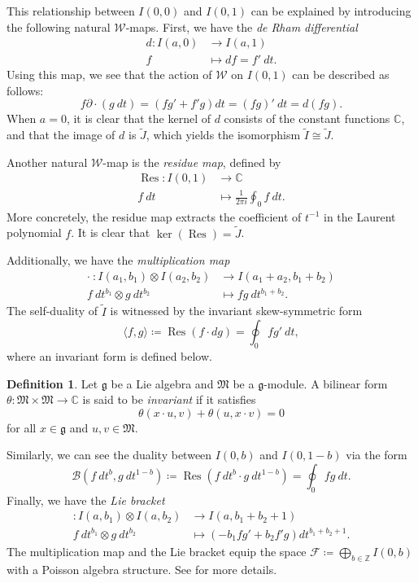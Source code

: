 \documentclass[11pt, svgnames]{amsart}
\DeclareMathOperator{\Res}{Res}
\newcommand{\g}{\ensuremath{\mathfrak{g}}}
\newcommand{\M}{\mathfrak{M}}
\newcommand{\ZZ}{\mathbb{Z}}
\newcommand{\CC}{\mathbb{C}}
\newcommand{\W}{\mathcal{W}}
\newcommand{\del}{\partial}
\newcommand{\ang}[1]{\langle #1 \rangle}
\theoremstyle{definition}
\newtheorem{defn}[proposition]{Definition}
\begin{document}
This relationship between $I(0,0)$ and $I(0,1)$ can be explained by introducing the following natural $\W$-maps. First, we have the \emph{de Rham differential}
\begin{align*}
    d \colon I(a,0) &\to I(a,1) \\
    f &\mapsto df = f' \ dt.
\end{align*}
Using this map, we see that the action of $\W$ on $I(0,1)$ can be described as follows:
$$f\del \cdot (g \ dt) = (fg' + f'g)dt = (fg)' \ dt = d(fg).$$
When $a = 0$, it is clear that the kernel of $d$ consists of the constant functions $\CC$, and that the image of $d$ is $\widetilde{J}$, which yields the isomorphism $\widetilde{I} \cong \widetilde{J}$.

Another natural $\W$-map is the \emph{residue map}, defined by
\begin{align*}
    \Res \colon I(0,1) &\to \CC \\
    f \ dt &\mapsto \frac{1}{2\pi i}\oint_0 f \ dt. 
\end{align*}
More concretely, the residue map extracts the coefficient of $t^{-1}$ in the Laurent polynomial $f$. It is clear that $\ker(\Res) = \widetilde{J}$.

Additionally, we have the \emph{multiplication map}
\begin{align*}
    \cdot \ \colon I(a_1,b_1) \otimes I(a_2,b_2) &\to I(a_1 + a_2, b_1 + b_2) \\
    f \ dt^{b_1} \otimes g \ dt^{b_2} &\mapsto fg \ dt^{b_1 + b_2}.
\end{align*}
The self-duality of $\widetilde{I}$ is witnessed by the invariant skew-symmetric form
\begin{equation}\label{eq:self duality of I}
    \ang{f,g} \coloneqq \Res(f \cdot dg) = \oint_0 fg' \ dt,
\end{equation}
where an invariant form is defined below.

\begin{defn}
    Let $\g$ be a Lie algebra and $\M$ be a $\g$-module. A bilinear form $\theta \colon \M \times \M \to \CC$ is said to be \emph{invariant} if it satisfies
    $$\theta(x \cdot u,v) + \theta(u,x \cdot v) = 0$$
    for all $x \in \g$ and $u,v \in \M$.
\end{defn}

Similarly, we can see the duality between $I(0,b)$ and $I(0,1 - b)$ via the form
\begin{equation}\label{eq:B form}
    \mathcal{B}(f \ dt^b, g \ dt^{1 - b}) \coloneqq \Res(f \ dt^b \cdot g \ dt^{1 - b}) = \oint_0 fg \ dt.
\end{equation}
Finally, we have the \emph{Lie bracket}
\begin{align*}
    [-,-] \colon I(a,b_1) \otimes I(a,b_2) &\to I(a, b_1 + b_2 + 1) \\
    f \ dt^{b_1} \otimes g \ dt^{b_2} &\mapsto (-b_1fg' + b_2f'g)dt^{b_1 + b_2 + 1}.
\end{align*}
The multiplication map and the Lie bracket equip the space $\mathcal{F} \coloneqq \bigoplus_{b \in \ZZ} I(0,b)$ with a Poisson algebra structure. See \cite[Theorem 2.10]{Schlichenmaier:2012ika} for more details.
\end{document}
